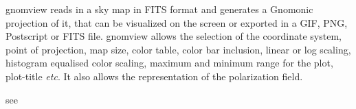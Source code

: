 





\begin{codedescription}
{gnomview reads in a \healpix sky map in FITS format and generates a
Gnomonic projection of it, that can be visualized on the screen or
exported in a GIF, PNG, Postscript or FITS file. gnomview allows the selection of
the coordinate system, point of projection, map size, color table, color bar inclusion,
linear or log scaling, histogram equalised
color scaling, maximum and 
minimum range for the plot, plot-title {\it etc}. It also allows the representation of the
polarization field. }
\end{codedescription}

%
\begin{related}
  \begin{sulist}{} %
  \item[{\ }] see 
  \end{sulist}
\end{related}

